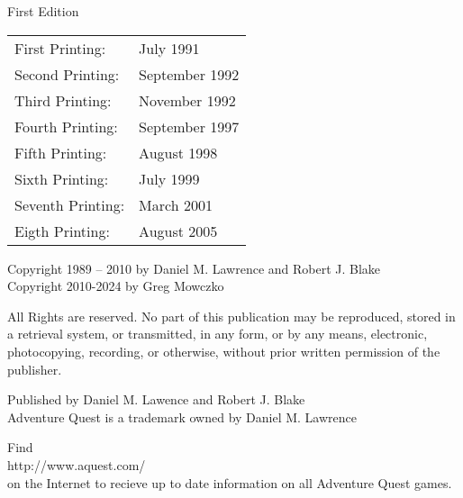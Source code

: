 First Edition

\vspace*{1cm}
\begin{tabular}{ l l }
First Printing: & July 1991\\
Second Printing: & September 1992\\
Third Printing: & November 1992\\
Fourth Printing: & September 1997\\
Fifth Printing: & August 1998\\
Sixth Printing: & July 1999\\
Seventh Printing: & March 2001\\
Eigth Printing: & August 2005
\end{tabular}

\vspace*{1cm}
Copyright 1989 – 2010 by Daniel M. Lawrence and Robert J. Blake\\
Copyright 2010-2024 by Greg Mowczko

\vspace*{0.5cm}
All Rights are reserved. No part of this publication may be reproduced, stored in a retrieval system, or transmitted, in any form, or by any means, electronic, photocopying, recording, or otherwise, without prior written permission of the publisher.

\vspace*{1cm}
Published by Daniel M. Lawence and Robert J. Blake\\
Adventure Quest is a trademark owned by Daniel M. Lawrence

\vspace*{1cm}
Find\\
http://www.aquest.com/\\
on the Internet to recieve up to date information on all Adventure Quest games.